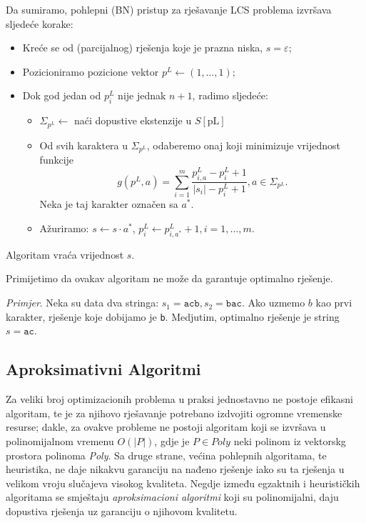 \documentclass[a4paper, utf8, 11pt, colorlinks]{article}
\begin{document}
\noindent Da sumiramo, pohlepni (BN) pristup za rješavanje LCS problema izvršava sljedeće korake:
\begin{itemize}
	\item Kreće se od (parcijalnog) rješenja koje je prazna niska, $s=\varepsilon$;
	\item Pozicioniramo pozicione vektor $p^L \gets (1,\ldots, 1) $;
	\item Dok god jedan od $p^L_i$ nije jednak $n+1$, radimo sljedeće: 
	\begin{itemize}
   	     \item $\Sigma_{p^L} \gets$ naći dopustive ekstenzije u $S[\textrm{pL}]$
	      \item Od svih karaktera u $\Sigma_{p^L}$, odaberemo onaj koji minimizuje vrijednost funkcije 
	      $$g( p^L,a) = \sum_{i=1}^m\frac{p^L_{i,a} - p^L_i + 1 }{|s_i| - p^L_i + 1 }, a \in \Sigma_{ p^L }.$$
	      Neka je taj karakter označen sa $a^*$. 
	      \item Ažuriramo: $s \gets  s \cdot a^*$, $p^L_i \gets p^L_{i, a^*} +1, i = 1,\ldots,m.$
    \end{itemize}
\end{itemize}
Algoritam vraća vrijednost $s$. 

Primijetimo da ovakav algoritam ne može da garantuje optimalno rješenje. 

\noindent \emph{Primjer}.  Neka su data dva stringa: $s_1 = \texttt{acb}, s_2 = \texttt{bac}$. Ako uzmemo  $ b$ kao prvi karakter, rješenje koje dobijamo je \texttt{b}. Medjutim, optimalno rješenje je string $s=\texttt{ac}$. 

\subsection{Aproksimativni Algoritmi}
  
   Za veliki broj optimizacionih problema u praksi jednostavno ne postoje efikasni algoritam, te je za  njihovo rješavanje potrebano izdvojiti ogromne vremenske resurse; dakle, za  ovakve probleme ne postoji algoritam koji se izvršava u polinomijalnom vremenu $O(|P|)$, gdje je $P \in {Poly}$ neki polinom iz vektorskg prostora polinoma \emph{Poly}. Sa druge strane, većina pohlepnih algoritama, te heuristika, ne daje nikakvu garanciju na nađeno rješenje iako su ta rješenja u velikom vroju slučajeva visokog kvaliteta. Negdje između egzaktnih i heurističkih algoritama se smještaju \emph{aproksimacioni algoritmi} koji su polinomijalni, daju dopustiva rješenja uz garanciju o njihovom kvalitetu. 
  
\end{document}
